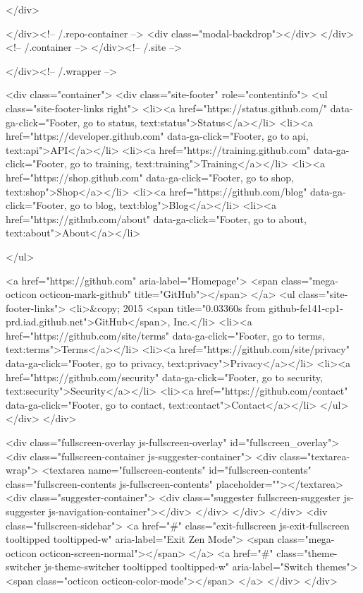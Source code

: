         </div>

      </div><!-- /.repo-container -->
      <div class="modal-backdrop"></div>
    </div><!-- /.container -->
  </div><!-- /.site -->


    </div><!-- /.wrapper -->

      <div class="container">
  <div class="site-footer" role="contentinfo">
    <ul class="site-footer-links right">
        <li><a href="https://status.github.com/" data-ga-click="Footer, go to status, text:status">Status</a></li>
      <li><a href="https://developer.github.com" data-ga-click="Footer, go to api, text:api">API</a></li>
      <li><a href="https://training.github.com" data-ga-click="Footer, go to training, text:training">Training</a></li>
      <li><a href="https://shop.github.com" data-ga-click="Footer, go to shop, text:shop">Shop</a></li>
        <li><a href="https://github.com/blog" data-ga-click="Footer, go to blog, text:blog">Blog</a></li>
        <li><a href="https://github.com/about" data-ga-click="Footer, go to about, text:about">About</a></li>

    </ul>

    <a href="https://github.com" aria-label="Homepage">
      <span class="mega-octicon octicon-mark-github" title="GitHub"></span>
</a>
    <ul class="site-footer-links">
      <li>&copy; 2015 <span title="0.03360s from github-fe141-cp1-prd.iad.github.net">GitHub</span>, Inc.</li>
        <li><a href="https://github.com/site/terms" data-ga-click="Footer, go to terms, text:terms">Terms</a></li>
        <li><a href="https://github.com/site/privacy" data-ga-click="Footer, go to privacy, text:privacy">Privacy</a></li>
        <li><a href="https://github.com/security" data-ga-click="Footer, go to security, text:security">Security</a></li>
        <li><a href="https://github.com/contact" data-ga-click="Footer, go to contact, text:contact">Contact</a></li>
    </ul>
  </div>
</div>


    <div class="fullscreen-overlay js-fullscreen-overlay" id="fullscreen_overlay">
  <div class="fullscreen-container js-suggester-container">
    <div class="textarea-wrap">
      <textarea name="fullscreen-contents" id="fullscreen-contents" class="fullscreen-contents js-fullscreen-contents" placeholder=""></textarea>
      <div class="suggester-container">
        <div class="suggester fullscreen-suggester js-suggester js-navigation-container"></div>
      </div>
    </div>
  </div>
  <div class="fullscreen-sidebar">
    <a href="#" class="exit-fullscreen js-exit-fullscreen tooltipped tooltipped-w" aria-label="Exit Zen Mode">
      <span class="mega-octicon octicon-screen-normal"></span>
    </a>
    <a href="#" class="theme-switcher js-theme-switcher tooltipped tooltipped-w"
      aria-label="Switch themes">
      <span class="octicon octicon-color-mode"></span>
    </a>
  </div>
</div>




